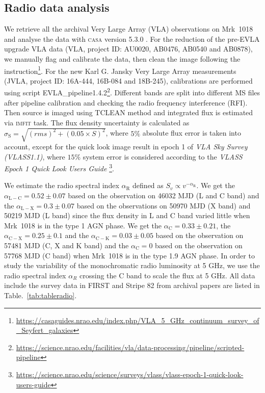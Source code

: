\documentclass[twocolumn]{aastex63}
\begin{document}
\subsection{Radio data analysis}
\label{subsec:vla}
We retrieve all the archival Very Large Array (VLA) observations on Mrk~1018 and analyse the data with \textsc{casa} version 5.3.0 \citep{2007ASPC..376..127M}. For the reduction of the pre-EVLA upgrade VLA data (VLA, project ID: AU0020, AB0476, AB0540 and AB0878), we manually flag and calibrate the data, then clean the image following the instruction\footnote{\url{https://casaguides.nrao.edu/index.php/VLA_5_GHz_continuum_survey_of_Seyfert_galaxies}}. For the new Karl G. Jansky Very Large Array measurements (JVLA, project ID: 16A-444, 16B-084 and 18B-245), calibrations are performed using script {EVLA\_pipeline1.4.2}\footnote{\url{https://science.nrao.edu/facilities/vla/data-processing/pipeline/scripted-pipeline}}. Different bands are split into different MS files after pipeline calibration and checking the radio frequency interference (RFI). Then source is imaged using {\scriptsize TCLEAN} method and integrated flux is estimated via \textsc{imfit} task. The flux density uncertainty is calculated as $\sigma_\mathrm{S}=\sqrt{(rms)^2+(0.05\times S)^2}$, where $5 \%$ absolute flux error is taken into account, except for the quick look image result in epoch 1 of  {\em VLA Sky Survey (VLASS1.1)}, where $15 \%$ system error is considered according to the {\em VLASS Epoch 1 Quick Look Users Guide} \footnote{\url{https://science.nrao.edu/science/surveys/vlass/vlass-epoch-1-quick-look-users-guide}}. 

We estimate the radio spectral index $\alpha_\mathrm{R}$ defined as $S_v \propto v^{-\alpha_\mathrm{R}}$. We get the $\alpha_\mathrm{L-C} =0.52 \pm 0.07$ based on the observation on 46032 MJD (L and C band) and the $\alpha_\mathrm{L-X} =0.3 \pm 0.07$ based on the observations on 50970 MJD (X band) and 50219 MJD (L band) since the flux density in L and C band varied little when Mrk~1018 is in the type 1 AGN phase. We get the $\alpha_\mathrm{C} =0.33\pm0.21$, the $\alpha_\mathrm{C-X} =0.25\pm0.1$ and the $\alpha_\mathrm{C-K} =0.03\pm0.05$ based on the observation on 57481 MJD (C, X and K band) and the $\alpha_\mathrm{C} =0$ based on the observation on 57768 MJD (C band) when Mrk~1018 is in the type 1.9 AGN phase. In order to study the variability of the monochromatic radio luminosity at 5 GHz, we use the radio spectral index $\alpha_R$ crossing the C band to scale the flux at 5 GHz. All data include the survey data in FIRST \citep{1994ASPC...61..165B,1995ApJ...450..559B} and Stripe 82 \citep{2011AJ....142....3H} from archival papers are listed in Table.~\ref{tab:tableradio}. 
\end{document}
